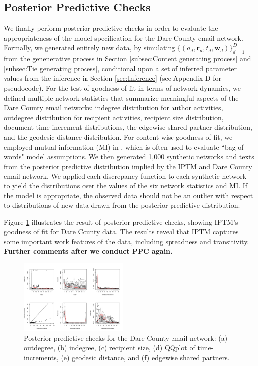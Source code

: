 \documentclass{article}
\begin{document}
\subsection{Posterior Predictive Checks}\label{subsec:PPC}
We finally perform posterior predictive checks \cite{rubin1984bayesianly} in order to evaluate the appropriateness of the model specification for the Dare County email network. Formally, we generated entirely new data, by simulating $\{(a_{d}, \boldsymbol{r}_{d}, t_{d}, \boldsymbol{w}_{d})\}_{d=1}^D$ from the genenerative process in Section \ref{subsec:Content generating process} and \ref{subsec:Tie generating process}, conditional upon a set of inferred parameter values from the inference in Section \ref{sec:Inference} (see Appendix D for pseudocode). For the test of goodness-of-fit in terms of network dynamics, we defined multiple network statistics that summarize meaningful aspects of the Dare County email networks: indegree distribution for author activities, outdegree distribution for recipient activities, recipient size distribution, document time-increment distributions, the edgewise shared partner distribution, and the geodesic distance distribution. For content-wise goodness-of-fit, we employed mutual information (MI) in \cite{mimno2011bayesian}, which is often used to evaluate ``bag of words" model assumptions. We then generated 1,000 synthetic networks and texts from the posterior predictive distribution implied by the IPTM and Dare County email network.
We applied each discrepancy function to each synthetic network to yield the distributions over the values of the six network statistics and MI. If the model is appropriate, the observed data should not be an outlier with respect to distributions of new data drawn from the posterior predictive distribution. 

Figure \ref{fig:PPC} illustrates the result of posterior predictive checks, showing IPTM's goodness of fit for Dare County data. The results reveal that IPTM captures some important work features of the data, including spreadness and transitivity. \textbf{Further comments after we conduct PPC again.}
\begin{figure}[h]
	\centering
	\includegraphics[width = 0.47\textwidth]{plots/PPC_plot-1.png}
	\caption{Posterior predictive checks for the Dare County email network: (a) outdegree, (b) indegree, (c) recipient size, (d) QQplot of time-increments, (e) geodesic distance, and (f) edgewise shared partners.}
	\label{fig:PPC}
\end{figure}
\end{document}
